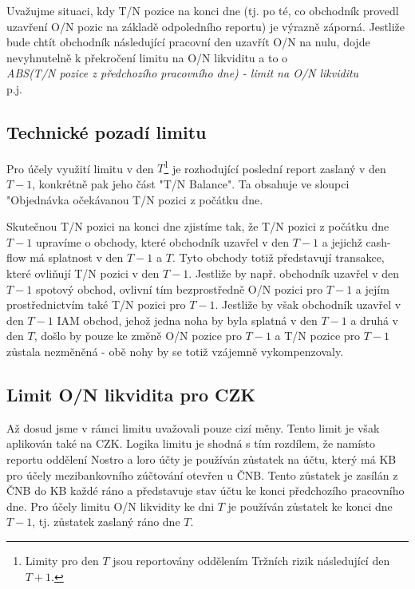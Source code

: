 \documentclass[a4paper]{book}
\begin{document}
Uvažujme situaci, kdy T/N pozice na konci dne (tj. po té, co obchodník provedl uzavření O/N pozic na základě odpoledního reportu) je výrazně záporná. Jestliže bude chtít obchodník následující pracovní den uzavřít O/N na nulu, dojde nevyhnutelně k překročení limitu na O/N likviditu a to o\\

\textit{ABS(T/N pozice z předchozího pracovního dne) - limit na O/N likviditu}\\

p.j.

\subsection{Technické pozadí limitu}

Pro účely využití limitu v den $T$\footnote{Limity pro den $T$ jsou reportovány oddělením Tržních rizik následující den $T+1$.} je rozhodující poslední report zaslaný v den $T-1$, konkrétně pak jeho část "T/N Balance". Ta obsahuje ve sloupci "Objednávka očekávanou T/N pozici z počátku dne.

Skutečnou T/N pozici na konci dne zjistíme tak, že T/N pozici z počátku dne $T-1$ upravíme o obchody, které obchodník uzavřel v den $T-1$ a jejichž cash-flow má splatnost v den $T-1$ a $T$. Tyto obchody totiž představují transakce, které ovliňují T/N pozici v den $T-1$. Jestliže by např. obchodník uzavřel v den $T-1$ spotový obchod, ovlivní tím bezprostředně O/N pozici pro $T-1$ a jejím prostřednictvím také T/N pozici pro $T-1$. Jestliže by však obchodník uzavřel v den $T-1$ IAM obchod, jehož jedna noha by byla splatná v den $T-1$ a druhá v den $T$, došlo by pouze ke změně O/N pozice pro $T-1$ a T/N pozice pro $T-1$ zůstala nezměněná - obě nohy by se totiž vzájemně vykompenzovaly.

\subsection{Limit O/N likvidita pro CZK}

Až dosud jsme v rámci limitu uvažovali pouze cizí měny. Tento limit je však aplikován také na CZK. Logika limitu je shodná s tím rozdílem, že namísto reportu oddělení Nostro a loro účty je používán zůstatek na účtu, který má KB pro účely mezibankovního zúčtování otevřen u ČNB. Tento zůstatek je zasílán z ČNB do KB každé ráno a představuje stav účtu ke konci předchozího pracovního dne. Pro účely limitu O/N likvidity ke dni $T$ je používán zůstatek ke konci dne $T-1$, tj. zůstatek zaslaný ráno dne $T$. 
\end{document}
